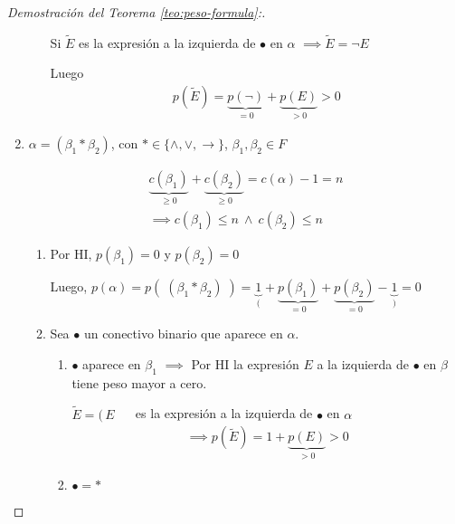 \begin{proof}[Demostración del Teorema \ref{teo:peso-formula}:]
\begin{enumerate}
\begin{enumerate}
                Si $\widetilde{E}$ es la expresión a la izquierda de $\bullet$ en
                $\alpha$ $\implies \widetilde{E} = \neg E$

                Luego
                \begin{gather*}
                    p(\widetilde{E}) = \underbrace{p(\neg)}_{=0} + 
                    \underbrace{p(E)}_{>0} > 0
                \end{gather*}
            \end{enumerate}
            

        \item $\alpha = ( \beta_1 * \beta_2)$, con 
            $* \in \{ \wedge, \vee, \to \}$, $\beta_1, \beta_2 \in F$

            \begin{gather*}
                \underbrace{c(\beta_1)}_{\geq 0} +
                \underbrace{c(\beta_2)}_{\geq 0} = c(\alpha) - 1 = n \\
                \implies c(\beta_1) \leq n ~ \wedge ~ c(\beta_2) \leq n
            \end{gather*}


            \begin{enumerate}
            \item Por HI, $p(\beta_1) = 0$ y $p(\beta_2) = 0$

            Luego, $p(\alpha) = p(\; (\beta_1 * \beta_2) \;)
            = \underbrace{1}_{(} 
            + \underbrace{p(\beta_1)}_{=0} 
            + \underbrace{p(\beta_2)}_{=0} 
            - \underbrace{1}_{)} = 0$

            \item Sea $\bullet$ un conectivo binario que aparece en $\alpha$.
            \begin{enumerate}
            \item $\bullet$ aparece en $\beta_1$ $\implies$ Por HI la 
                expresión $E$ a la izquierda de $\bullet$ en $\beta$ tiene
                peso mayor a cero.

                $\widetilde{E} = ( \, E$ $\quad$
                es la expresión a la izquierda de $\bullet$ en $\alpha$
                \begin{gather*}
                    \implies p(\widetilde{E}) = 1 + \underbrace{p(E)}_{>0}>0 
                \end{gather*}

            \item $\bullet = *$


\end{enumerate}
\end{enumerate}
\end{enumerate}
\end{proof}
